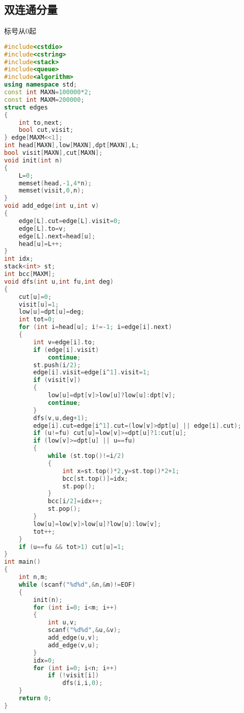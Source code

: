 \subsection{双连通分量}
    标号从$0$起
    \begin{lstlisting}[language=c++]
#include<cstdio>
#include<cstring>
#include<stack>
#include<queue>
#include<algorithm>
using namespace std;
const int MAXN=100000*2;
const int MAXM=200000;
struct edges
{
    int to,next;
    bool cut,visit;
} edge[MAXM<<1];
int head[MAXN],low[MAXN],dpt[MAXN],L;
bool visit[MAXN],cut[MAXN];
void init(int n)
{
    L=0;
    memset(head,-1,4*n);
    memset(visit,0,n);
}
void add_edge(int u,int v)
{
    edge[L].cut=edge[L].visit=0;
    edge[L].to=v;
    edge[L].next=head[u];
    head[u]=L++;
}
int idx;
stack<int> st;
int bcc[MAXM];
void dfs(int u,int fu,int deg)
{
    cut[u]=0;
    visit[u]=1;
    low[u]=dpt[u]=deg;
    int tot=0;
    for (int i=head[u]; i!=-1; i=edge[i].next)
    {
        int v=edge[i].to;
        if (edge[i].visit)
            continue;
        st.push(i/2);
        edge[i].visit=edge[i^1].visit=1;
        if (visit[v])
        {
            low[u]=dpt[v]>low[u]?low[u]:dpt[v];
            continue;
        }
        dfs(v,u,deg+1);
        edge[i].cut=edge[i^1].cut=(low[v]>dpt[u] || edge[i].cut);
        if (u!=fu) cut[u]=low[v]>=dpt[u]?1:cut[u];
        if (low[v]>=dpt[u] || u==fu)
        {
            while (st.top()!=i/2)
            {
                int x=st.top()*2,y=st.top()*2+1;
                bcc[st.top()]=idx;
                st.pop();
            }
            bcc[i/2]=idx++;
            st.pop();
        }
        low[u]=low[v]>low[u]?low[u]:low[v];
        tot++;
    }
    if (u==fu && tot>1) cut[u]=1;
}
int main()
{
    int n,m;
    while (scanf("%d%d",&n,&m)!=EOF)
    {
        init(n);
        for (int i=0; i<m; i++)
        {
            int u,v;
            scanf("%d%d",&u,&v);
            add_edge(u,v);
            add_edge(v,u);
        }
        idx=0;
        for (int i=0; i<n; i++)
            if (!visit[i])
                dfs(i,i,0);
    }
    return 0;
}
    \end{lstlisting}
